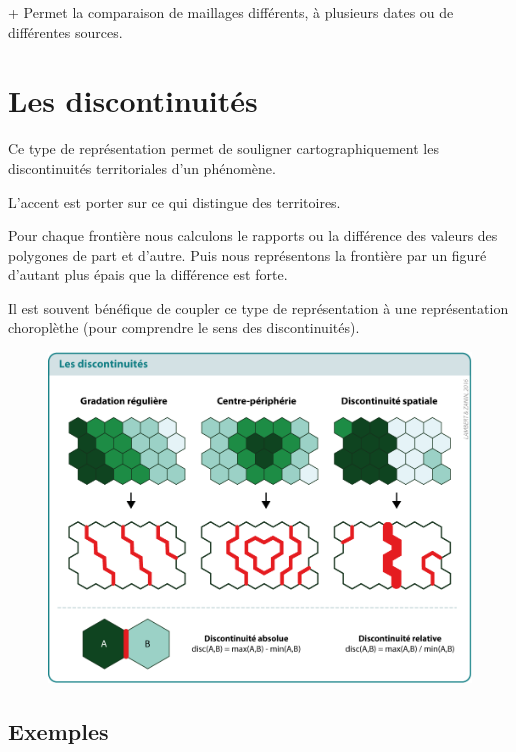 \documentclass[]{book}
\begin{document}
+ Permet la comparaison de maillages différents, à plusieurs dates ou de
différentes sources.

\section{Les discontinuités}\label{les-discontinuites}

Ce type de représentation permet de souligner cartographiquement les
discontinuités territoriales d'un phénomène.

L'accent est porter sur ce qui distingue des territoires.

Pour chaque frontière nous calculons le rapports ou la différence des
valeurs des polygones de part et d'autre. Puis nous représentons la
frontière par un figuré d'autant plus épais que la différence est forte.

Il est souvent bénéfique de coupler ce type de représentation à une
représentation choroplèthe (pour comprendre le sens des discontinuités).

\begin{figure}
\centering
\includegraphics{img/discmet.png}
\caption{}
\end{figure}

\subsection{Exemples}\label{exemples-1}
\end{document}
